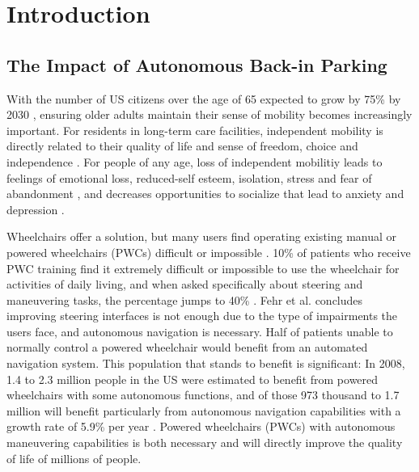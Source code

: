 

\chapter{Introduction}
\label{ch:Introduction}




\section{The Impact of Autonomous Back-in Parking}


With the number of US citizens over the age of 65 expected to grow by 75\% by
2030 \cite{simpson2008many}, ensuring older adults maintain their sense of
mobility becomes increasingly important.
For residents in long-term care facilities, independent mobility is directly
related to their quality of life and sense of freedom, choice and independence
\cite{bourret2002meaning}.
For people of any age, loss of independent mobilitiy leads to feelings of
emotional loss, reduced-self esteem, isolation, stress and fear of abandonment
\cite{finlayson2003experiencing}, and decreases opportunities to socialize that
lead to anxiety and depression \cite{iezzoni2001mobility}. 

Wheelchairs offer a solution, but many users find operating existing manual or
powered wheelchairs (PWCs) difficult or impossible \cite{simpson2008many}.
10\% of patients who receive PWC training find it extremely difficult or
impossible to use the wheelchair for activities of daily living, and
when asked specifically about steering and maneuvering tasks, the
percentage jumps to 40\% \cite{fehr2000adequacy}.
Fehr et al. \cite{fehr2000adequacy} concludes improving steering interfaces is
not enough due to the type of impairments the users face, and autonomous
navigation is necessary. Half of patients unable to normally control a powered
wheelchair would benefit from an automated navigation system.
This population that stands to benefit is significant:
In 2008, 1.4 to 2.3 million people in the US were estimated to
benefit from powered wheelchairs with some autonomous functions, and of those
973 thousand to 1.7 million will benefit particularly from autonomous
navigation capabilities with a growth rate of 5.9\% per year \cite{simpson2008many}.
Powered wheelchairs (PWCs) with autonomous maneuvering capabilities is both
necessary and will directly improve the quality of life of millions of people.

